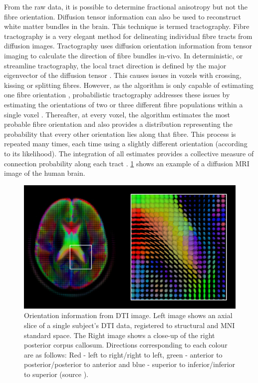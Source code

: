 From the raw data, it is possible to determine fractional anisotropy but not the fibre orientation. Diffusion tensor information can also be used to reconstruct white matter bundles in the brain. This technique is termed tractography. Fibre tractography is a very elegant method for delineating individual fibre tracts from diffusion images. Tractography uses diffusion orientation information from tensor imaging to calculate the direction of fibre bundles in-vivo. In deterministic, or streamline tractography, the local tract direction is defined by the major eigenvector of the diffusion tensor \citep{alexander2010deterministic}. This causes issues in voxels with crossing, kissing or splitting fibres. However, as the algorithm is only capable of estimating one fibre orientation \citep{alexander2010deterministic}, probabilistic tractography addresses these issues by estimating the orientations of two or three different fibre populations within a single voxel \citep{behrens2007probabilistic}. Thereafter, at every voxel, the algorithm estimates the most probable fibre orientation and also provides a distribution representing the probability that every other orientation lies along that fibre. This process is repeated many times, each time using a slightly different orientation (according to its likelihood). The integration of all estimates provides a collective measure of connection probability along each tract \citep{behrens2007probabilistic, behrens2003characterization}. \figurename \ref{fig:diff_mri} shows an example of a diffusion MRI image of the human brain.

\begin{figure}
	\centering
	\includegraphics[width=\textwidth]{fig/fmridti/dmri.png}
	\caption{Orientation information from DTI image. Left image shows an axial slice of a single subject's DTI data, registered to structural and MNI standard space. The Right image shows a close-up of the right posterior corpus callosum. Directions corresponding to each colour are as follows: Red - left to right/right to left, green - anterior to posterior/posterior to anterior and blue - superior to inferior/inferior to superior (source \citet{dtiwiki}).}
	\label{fig:diff_mri}
\end{figure}

